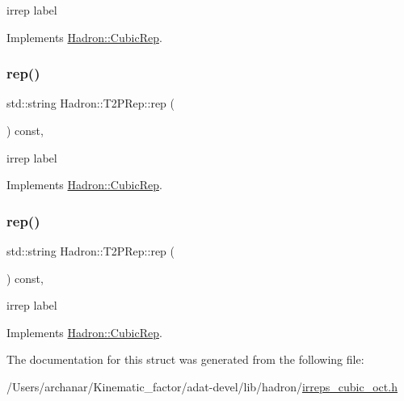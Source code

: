irrep label 

Implements \mbox{\hyperlink{structHadron_1_1CubicRep_ac3eb63608803d44c68681f158e14eb1b}{Hadron\+::\+Cubic\+Rep}}.

\mbox{\label{structHadron_1_1T2PRep_a34a7ab2061f6a666c64ba2b44e0f203d}} 
\subsubsection{\texorpdfstring{rep()}{rep()}\hspace{0.1cm}{\footnotesize\ttfamily [2/3]}}
{\footnotesize\ttfamily std\+::string Hadron\+::\+T2\+P\+Rep\+::rep (\begin{DoxyParamCaption}{ }\end{DoxyParamCaption}) const\hspace{0.3cm}{\ttfamily [inline]}, {\ttfamily [virtual]}}

irrep label 

Implements \mbox{\hyperlink{structHadron_1_1CubicRep_ac3eb63608803d44c68681f158e14eb1b}{Hadron\+::\+Cubic\+Rep}}.

\mbox{\label{structHadron_1_1T2PRep_a34a7ab2061f6a666c64ba2b44e0f203d}} 
\subsubsection{\texorpdfstring{rep()}{rep()}\hspace{0.1cm}{\footnotesize\ttfamily [3/3]}}
{\footnotesize\ttfamily std\+::string Hadron\+::\+T2\+P\+Rep\+::rep (\begin{DoxyParamCaption}{ }\end{DoxyParamCaption}) const\hspace{0.3cm}{\ttfamily [inline]}, {\ttfamily [virtual]}}

irrep label 

Implements \mbox{\hyperlink{structHadron_1_1CubicRep_ac3eb63608803d44c68681f158e14eb1b}{Hadron\+::\+Cubic\+Rep}}.



The documentation for this struct was generated from the following file\+:\begin{DoxyCompactItemize}
\item 
/\+Users/archanar/\+Kinematic\+\_\+factor/adat-\/devel/lib/hadron/\mbox{\hyperlink{adat-devel_2lib_2hadron_2irreps__cubic__oct_8h}{irreps\+\_\+cubic\+\_\+oct.\+h}}\end{DoxyCompactItemize}
